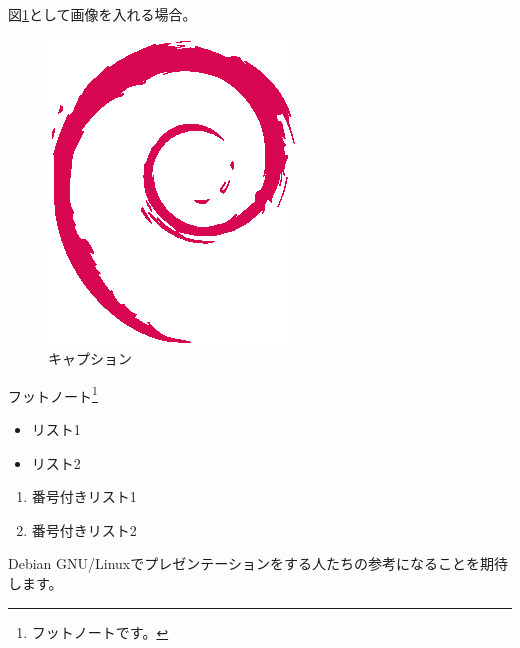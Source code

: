 \documentclass[mingoth,a4paper]{jsarticle}
\begin{document}
図\ref{fig:image01}として画像を入れる場合。
\begin{figure}[ht]
  \begin{center}
    \includegraphics[width=1\hsize]{images/openlogo-nd.eps}
  \end{center}
  \caption{キャプション}
  \label{fig:image01}
\end{figure}

フットノート\footnote{フットノートです。}

\begin{itemize}
\item リスト1
\item リスト2
\end{itemize}


\begin{enumerate}
\item 番号付きリスト1
\item 番号付きリスト2
\end{enumerate}

Debian GNU/Linuxでプレゼンテーションをする人たちの参考になることを期待
します。
\end{document}
